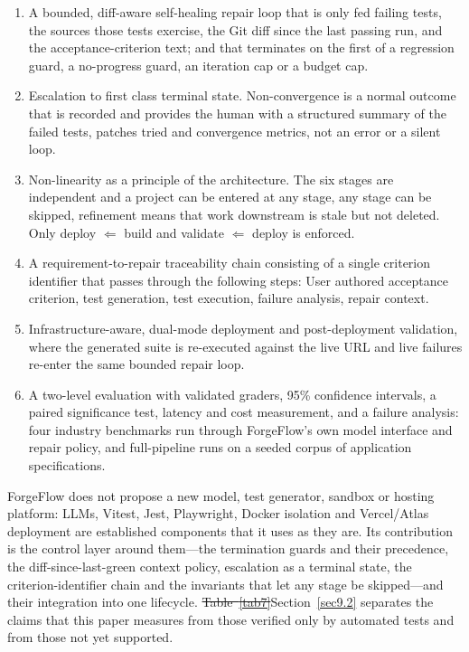 \documentclass[pdflatex,sn-mathphys-num]{sn-jnl}%
\newcommand{\chg}[1]{{\color{blue}#1}}
\newcommand{\del}[1]{{\color{red}\sout{#1}}}
\theoremstyle{thmstyleone}%
\theoremstyle{thmstyletwo}%
\theoremstyle{thmstylethree}%
\begin{document}
\begin{enumerate}
\item A bounded, diff-aware self-healing repair loop that is only fed failing tests, the sources those tests exercise, the Git diff since the last passing run, and the acceptance-criterion text; and that terminates on the first of a regression guard, a no-progress guard, an iteration cap or a budget cap.
\item Escalation to first class terminal state. Non-convergence is a normal outcome that is recorded and provides the human with a structured summary of the failed tests, patches tried and convergence metrics, not an error or a silent loop.
\item Non-linearity as a principle of the architecture. The six stages are independent and a project can be entered at any stage, any stage can be skipped, refinement means that work downstream is stale but not deleted. Only deploy $\Leftarrow$ build and validate $\Leftarrow$ deploy is enforced.
\item A requirement-to-repair traceability chain consisting of a single criterion identifier that passes through the following steps: User authored acceptance criterion, test generation, test execution, failure analysis, repair context.
\item Infrastructure-aware, dual-mode deployment and post-deployment validation, where the generated suite is re-executed against the live URL and live failures re-enter the same bounded repair loop.
\item A two-level evaluation with validated graders, 95\% confidence intervals, a paired significance test, latency and cost measurement, and a failure analysis: four industry benchmarks run through ForgeFlow's own model interface and repair policy, and full-pipeline runs on a seeded corpus of application specifications.
\end{enumerate}

ForgeFlow does not propose a new model, test generator, sandbox or hosting platform: LLMs, Vitest, Jest, Playwright, Docker isolation and Vercel/Atlas deployment are established components that it uses as they are. Its contribution is the control layer around them---the termination guards and their precedence, the diff-since-last-green context policy, escalation as a terminal state, the criterion-identifier chain and the invariants that let any stage be skipped---and their integration into one lifecycle. \del{Table~\ref{tab7}}\chg{Section~\ref{sec9.2}} separates the claims that this paper measures from those verified only by automated tests and from those not yet supported.%
\end{document}
